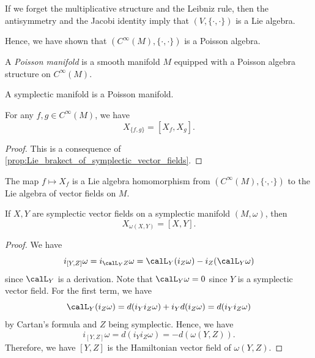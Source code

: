   \begin{remark}
    If we forget the multiplicative structure and the Leibniz rule, then the antisymmetry and the Jacobi identity imply that $(V, \{\cdot, \cdot\})$ is a Lie algebra.
  \end{remark}

  Hence, we have shown that $(C^\infty(M), \{\cdot, \cdot\})$ is a Poisson algebra.

  \begin{definition}
    A \emph{Poisson manifold} is a smooth manifold $M$ equipped with a Poisson algebra structure on $C^\infty(M)$.
  \end{definition}

  \begin{corollary}
    A symplectic manifold is a Poisson manifold.
  \end{corollary}
  
  \begin{lemma}
    For any $f, g \in C^\infty(M)$, we have
    \[ X_{\{f, g\}} = [X_f, X_g]. \]
  \end{lemma}
  \begin{proof}
    This is a consequence of \cref{prop:Lie_brakect_of_symplectic_vector_fields}.
  \end{proof}

  \begin{corollary}
    The map $f \mapsto X_f$ is a Lie algebra homomorphism from $(C^\infty(M), \{\cdot, \cdot\})$ to the Lie algebra of vector fields on $M$.
  \end{corollary}

  \begin{proposition}\label{prop:Lie_brakect_of_symplectic_vector_fields}
    If $X,Y$ are symplectic vector fields on a symplectic manifold $(M, \omega)$, then 
    \[ X_{\omega(X, Y)} = [X, Y]. \]
  \end{proposition}
  \begin{proof}
    We have 
    \[ i_{[Y, Z]} \omega = i_{\calL_Y Z} \omega = \calL_Y (i_Z \omega) - i_Z (\calL_Y \omega) \]
    since $\calL_Y$ is a derivation. 
    Note that $\calL_Y \omega = 0$ since $Y$ is a symplectic vector field. 
    For the first term, we have
    \[ \calL_Y (i_Z \omega) = d(i_Y i_Z \omega) + i_Y d(i_Z \omega) = d(i_Y i_Z \omega) \]
    by Cartan's formula and $Z$ being symplectic.
    Hence, we have
    \[ i_{[Y, Z]} \omega = d(i_Y i_Z \omega) = -d(\omega(Y, Z)). \]
    Therefore, we have $[Y, Z]$ is the Hamiltonian vector field of $\omega(Y, Z)$.
  \end{proof}

